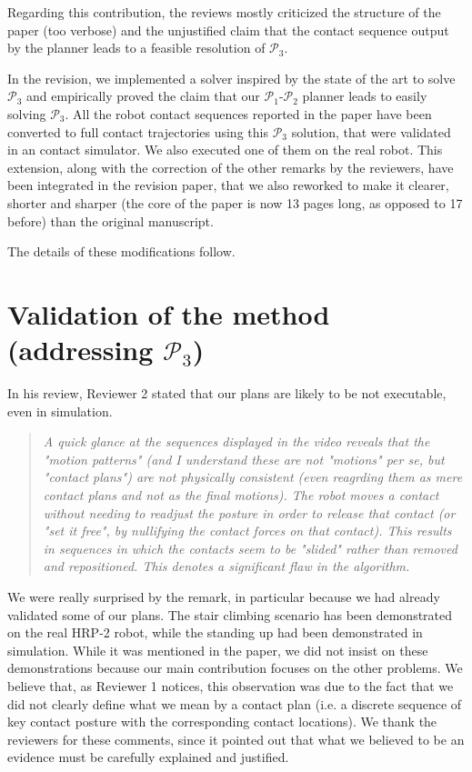 \documentclass[a4paper]{article}
\begin{document}
Regarding this contribution, the reviews mostly criticized the structure of the paper (too verbose) and the unjustified claim that the contact sequence output by the planner leads to a feasible resolution of $\mathcal{P}_3$.

In the revision, we implemented a solver inspired by the state of the art to solve $\mathcal{P}_3$ and empirically proved the claim that our $\mathcal{P}_1$-$\mathcal{P}_2$ planner leads to easily solving $\mathcal{P}_3$. 
All the robot contact sequences reported in the paper have been converted to full contact trajectories using this $\mathcal{P}_3$ solution, that were validated in an contact simulator.
We also executed one of them on the real robot.
This extension, along with the correction of the other remarks by the reviewers, have been integrated in the revision paper, that we also reworked to make it clearer, shorter and sharper (the core of the paper is now 13 pages long, as opposed to 17 before) than the original manuscript.

The details of these modifications follow.

\section{Validation of the method (addressing  $\mathcal{P}_3$) }
In his review, Reviewer 2 stated that our plans are likely to be not executable, even in simulation.

\begin{quote}
  \textit{A quick glance at the sequences displayed in the video reveals that the "motion patterns" (and I understand these are not "motions" per se, but "contact plans") are not physically consistent (even reagrding them as mere contact plans and not as the final motions). The robot moves a contact without needing to readjust the posture in order to release that contact (or "set it free", by nullifying the contact forces on that contact). This results in sequences in which the contacts seem to be "slided" rather than removed and repositioned. This denotes a significant flaw in the algorithm.   }
\end{quote}

We were really surprised by the remark, in particular because we had already validated some of our plans.
The stair climbing scenario has been demonstrated on the real HRP-2 robot, while the standing up had been demonstrated in simulation. 
While it was mentioned in the paper, we did not insist on these demonstrations because our main contribution focuses on the other problems. 
We believe that, as Reviewer 1 notices, this observation was due to the fact that we did not clearly define what we mean by a contact plan (i.e. a discrete sequence of key contact posture with the corresponding contact locations).
We thank the reviewers for these comments, since it pointed out that what we believed to be an evidence must be carefully explained and justified.
\end{document}
